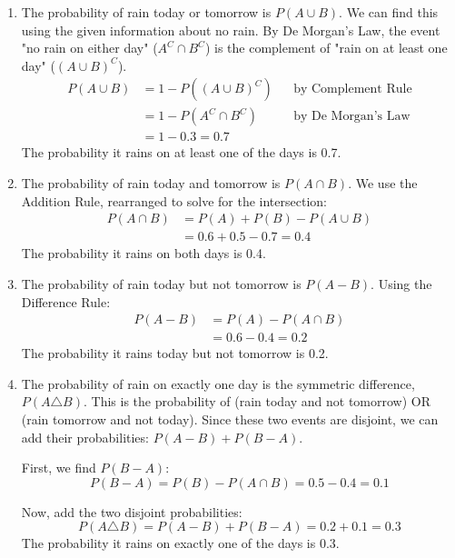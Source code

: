 \begin{solution}
    \begin{enumerate}[label=(\alph*)]
        \item The probability of rain today or tomorrow is $P(A \cup B)$. We can find this using the given information about no rain. By De Morgan's Law, the event "no rain on either day" ($A^C \cap B^C$) is the complement of "rain on at least one day" ($(A \cup B)^C$).
        \begin{align*}
            P(A \cup B) &= 1 - P((A \cup B)^C) &&\text{by Complement Rule} \\
                        &= 1 - P(A^C \cap B^C) &&\text{by De Morgan's Law} \\
                        &= 1 - 0.3 = 0.7
        \end{align*}
        The probability it rains on at least one of the days is 0.7.

        \item The probability of rain today and tomorrow is $P(A \cap B)$. We use the Addition Rule, rearranged to solve for the intersection:
        \begin{align*}
            P(A \cap B) &= P(A) + P(B) - P(A \cup B) \\
                        &= 0.6 + 0.5 - 0.7 = 0.4
        \end{align*}
        The probability it rains on both days is 0.4.

        \item The probability of rain today but not tomorrow is $P(A - B)$. Using the Difference Rule:
        \begin{align*}
            P(A - B) &= P(A) - P(A \cap B) \\
                      &= 0.6 - 0.4 = 0.2
        \end{align*}
        The probability it rains today but not tomorrow is 0.2.
        
        \item The probability of rain on exactly one day is the symmetric difference, $P(A \triangle B)$. This is the probability of (rain today and not tomorrow) OR (rain tomorrow and not today). Since these two events are disjoint, we can add their probabilities: $P(A-B) + P(B-A)$.
        
        First, we find $P(B-A)$:
        \[ P(B - A) = P(B) - P(A \cap B) = 0.5 - 0.4 = 0.1 \]
        
        Now, add the two disjoint probabilities:
        \[ P(A \triangle B) = P(A-B) + P(B-A) = 0.2 + 0.1 = 0.3 \]
        The probability it rains on exactly one of the days is 0.3.
    \end{enumerate}
\end{solution}